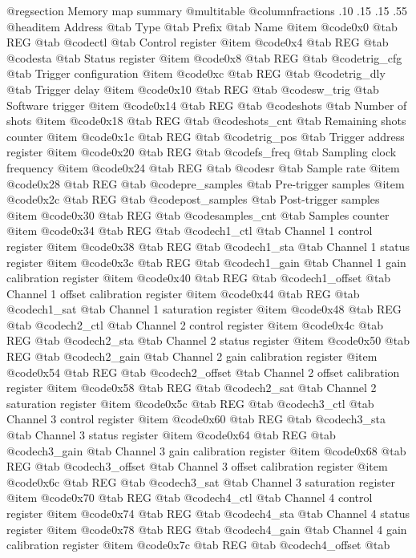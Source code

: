@regsection Memory map summary
@multitable  @columnfractions .10 .15 .15 .55
@headitem Address @tab Type @tab Prefix @tab Name
@item @code{0x0} @tab
REG @tab
@code{ctl} @tab
Control register
@item @code{0x4} @tab
REG @tab
@code{sta} @tab
Status register
@item @code{0x8} @tab
REG @tab
@code{trig_cfg} @tab
Trigger configuration
@item @code{0xc} @tab
REG @tab
@code{trig_dly} @tab
Trigger delay
@item @code{0x10} @tab
REG @tab
@code{sw_trig} @tab
Software trigger
@item @code{0x14} @tab
REG @tab
@code{shots} @tab
Number of shots
@item @code{0x18} @tab
REG @tab
@code{shots_cnt} @tab
Remaining shots counter
@item @code{0x1c} @tab
REG @tab
@code{trig_pos} @tab
Trigger address register
@item @code{0x20} @tab
REG @tab
@code{fs_freq} @tab
Sampling clock frequency
@item @code{0x24} @tab
REG @tab
@code{sr} @tab
Sample rate
@item @code{0x28} @tab
REG @tab
@code{pre_samples} @tab
Pre-trigger samples
@item @code{0x2c} @tab
REG @tab
@code{post_samples} @tab
Post-trigger samples
@item @code{0x30} @tab
REG @tab
@code{samples_cnt} @tab
Samples counter
@item @code{0x34} @tab
REG @tab
@code{ch1_ctl} @tab
Channel 1 control register
@item @code{0x38} @tab
REG @tab
@code{ch1_sta} @tab
Channel 1 status register
@item @code{0x3c} @tab
REG @tab
@code{ch1_gain} @tab
Channel 1 gain calibration register
@item @code{0x40} @tab
REG @tab
@code{ch1_offset} @tab
Channel 1 offset calibration register
@item @code{0x44} @tab
REG @tab
@code{ch1_sat} @tab
Channel 1 saturation register
@item @code{0x48} @tab
REG @tab
@code{ch2_ctl} @tab
Channel 2 control register
@item @code{0x4c} @tab
REG @tab
@code{ch2_sta} @tab
Channel 2 status register
@item @code{0x50} @tab
REG @tab
@code{ch2_gain} @tab
Channel 2 gain calibration register
@item @code{0x54} @tab
REG @tab
@code{ch2_offset} @tab
Channel 2 offset calibration register
@item @code{0x58} @tab
REG @tab
@code{ch2_sat} @tab
Channel 2 saturation register
@item @code{0x5c} @tab
REG @tab
@code{ch3_ctl} @tab
Channel 3 control register
@item @code{0x60} @tab
REG @tab
@code{ch3_sta} @tab
Channel 3 status register
@item @code{0x64} @tab
REG @tab
@code{ch3_gain} @tab
Channel 3 gain calibration register
@item @code{0x68} @tab
REG @tab
@code{ch3_offset} @tab
Channel 3 offset calibration register
@item @code{0x6c} @tab
REG @tab
@code{ch3_sat} @tab
Channel 3 saturation register
@item @code{0x70} @tab
REG @tab
@code{ch4_ctl} @tab
Channel 4 control register
@item @code{0x74} @tab
REG @tab
@code{ch4_sta} @tab
Channel 4 status register
@item @code{0x78} @tab
REG @tab
@code{ch4_gain} @tab
Channel 4 gain calibration register
@item @code{0x7c} @tab
REG @tab
@code{ch4_offset} @tab
